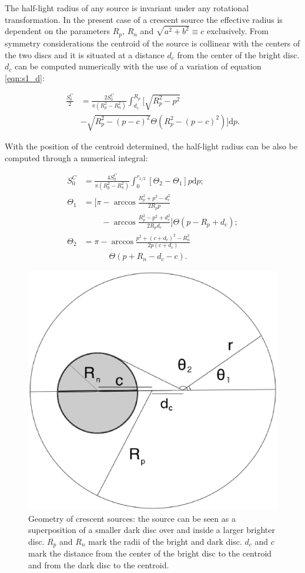 \documentclass[usenatbib]{mn2e}
\begin{document}
The half-light radius of any source is invariant under any rotational
transformation.  In the present case of a crescent source the
effective radius is dependent on the parameters $R_p$, $R_n$ and
$\sqrt{a^2+b^2}\equiv c $ exclusively. From symmetry considerations
the centroid of the source is collinear with the centers of the two
discs and it is situated at a distance $d_c$ from the center of the
bright disc. $d_c$ can be computed numerically with the use of a
variation of equation \ref{eqn:s1_d}:

\begin{equation}
\begin{aligned}
\frac{S_0^C}{2} & = \frac{2 S_0^C}{\pi \left(R_p^2-R_n^2 \right)} \int_{d_c}^{R_p} \bigg[ \sqrt{R_p^2 - p^2} \\ 
        & - \sqrt{R_p^2 - \left(p-c\right)^2} \Theta \left(R_p^2 - \left(p-c\right)^2 \right) \bigg] \mathrm{d}p. 
\end{aligned}
\end{equation}   

With the position of the centroid determined, the half-light radius
can be also be computed through a numerical integral:
 
\begin{equation}
\begin{aligned}
S_0^C &=  \frac{4S_0^C}{\pi \left(R_p^2-R_n^2 \right)} \int_{0}^{r_{1/2}} \left[ \Theta_2  - \Theta_1  \right] p \mathrm{d}p; \\
\Theta_1 &= \bigg[ \pi - \arccos \frac{R_p^2 + p^2 -d_c^2}{2 R_p p} \\
         & \phantom{= \bigg[ \pi} - \arccos \frac{R_p^2 - p^2 + d_c^2}{2 R_p d_c}
            \bigg] \Theta \left( p - R_p + d_c \right); \\
\Theta_2 &=  \pi - \arccos \frac{ p^2  + (c+d_c)^2 - R_n^2}
                                {2 p \left(c + d_c \right)} \\
         & \phantom{= \pi - } \Theta \left( p + R_n - d_c -c \right). 
\end{aligned}
\end{equation}

\begin{figure}
\includegraphics[width = .49\textwidth]{figures/figure_rhalf2.eps}
\caption{\label{fig:geom_crescent} Geometry of crescent sources: the source can be seen as a superposition
 of a smaller dark disc over and inside a larger brighter disc. $R_p$ and $R_n$ mark the radii of the 
bright and dark disc. $d_c$ and $c$ mark the distance from the center of the bright disc to the 
centroid and from the dark disc to the centroid.  }
\end{figure}
\end{document}
